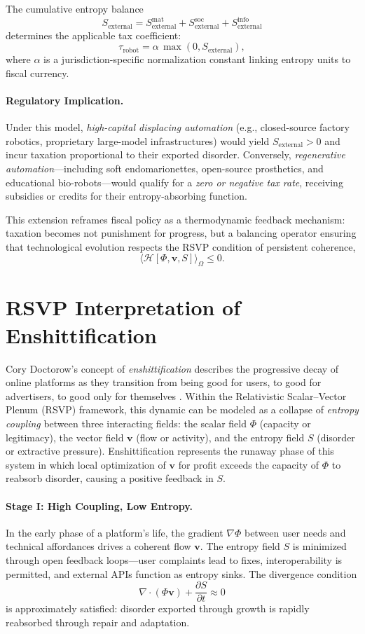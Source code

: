 \documentclass[12pt]{article}
\begin{document}
The cumulative entropy balance
\[
S_{\text{external}} = S_{\text{external}}^{\text{mat}} + S_{\text{external}}^{\text{soc}} + S_{\text{external}}^{\text{info}}
\]
determines the applicable tax coefficient:
\[
\tau_{\text{robot}} = \alpha \, \max(0, S_{\text{external}}),
\]
where $\alpha$ is a jurisdiction-specific normalization constant linking entropy units to fiscal currency.

\paragraph{Regulatory Implication.}
Under this model, \emph{high-capital displacing automation} (e.g., closed-source factory robotics, proprietary large-model infrastructures) would yield $S_{\text{external}}>0$ and incur taxation proportional to their exported disorder. Conversely, \emph{regenerative automation}—including soft endomarionettes, open-source prosthetics, and educational bio-robots—would qualify for a \emph{zero or negative tax rate}, receiving subsidies or credits for their entropy-absorbing function.

This extension reframes fiscal policy as a thermodynamic feedback mechanism: taxation becomes not punishment for progress, but a balancing operator ensuring that technological evolution respects the RSVP condition of persistent coherence,
\[
\langle \mathcal{H}[\Phi,\mathbf{v},S] \rangle_{\Omega} \le 0.
\]

\section{RSVP Interpretation of Enshittification}
\label{sec:enshittification}
Cory Doctorow’s concept of \emph{enshittification} describes the progressive decay of online platforms as they transition from being good for users, to good for advertisers, to good only for themselves \citep{doctorow2023enshittification}. Within the Relativistic Scalar–Vector Plenum (RSVP) framework, this dynamic can be modeled as a collapse of \emph{entropy coupling} between three interacting fields: the scalar field $\Phi$ (capacity or legitimacy), the vector field $\mathbf{v}$ (flow or activity), and the entropy field $S$ (disorder or extractive pressure). Enshittification represents the runaway phase of this system in which local optimization of $\mathbf{v}$ for profit exceeds the capacity of $\Phi$ to reabsorb disorder, causing a positive feedback in $S$.

\paragraph{Stage I: High Coupling, Low Entropy.}
In the early phase of a platform’s life, the gradient $\nabla\Phi$ between user needs and technical affordances drives a coherent flow $\mathbf{v}$. The entropy field $S$ is minimized through open feedback loops—user complaints lead to fixes, interoperability is permitted, and external APIs function as entropy sinks. The divergence condition
\[
\nabla\!\cdot(\Phi\mathbf{v}) + \frac{\partial S}{\partial t} \approx 0
\]
is approximately satisfied: disorder exported through growth is rapidly reabsorbed through repair and adaptation.
\end{document}

